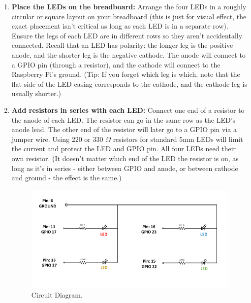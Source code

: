 \documentclass[a4paper,11pt]{article}
\begin{document}
\begin{enumerate}
    \item \textbf{Place the LEDs on the breadboard:} Arrange the four LEDs in a roughly circular or square 
        layout on your breadboard (this is just for visual effect, the exact placement isn't
        critical as long as each LED is in a separate row). Ensure the legs of each LED are in 
        different rows so they aren't accidentally connected. Recall that an LED has polarity: 
        the longer leg is the positive anode, and the shorter leg is the negative cathode. 
        The anode will connect to a GPIO pin (through a resistor), and the cathode will 
        connect to the Raspberry Pi's ground. (Tip: If you forget which leg is which, 
        note that the flat side of the LED casing corresponds to the cathode, and the 
        cathode leg is usually shorter.)

    \item \textbf{Add resistors in series with each LED:} Connect one end of a resistor to the anode of each LED. 
        The resistor can go in the same row as the LED's anode lead. 
        The other end of the resistor will later go to a GPIO pin via a jumper wire. 
        Using 220 or 330 $\Omega$ resistors for standard 5mm LEDs will limit the current 
        and protect the LED and GPIO pin. All four LEDs need their own resistor. 
        (It doesn't matter which end of the LED the resistor is on, as long as it's in series - 
        either between GPIO and anode, or between cathode and ground - the effect is the same.)
    
    \begin{figure}[h] %
        \centering
        \includegraphics[width=1\textwidth]{fig1.pdf} %
        \caption{Circuit Diagram.}
        \label{fig:runtime}
    \end{figure}


\end{enumerate}
\end{document}
